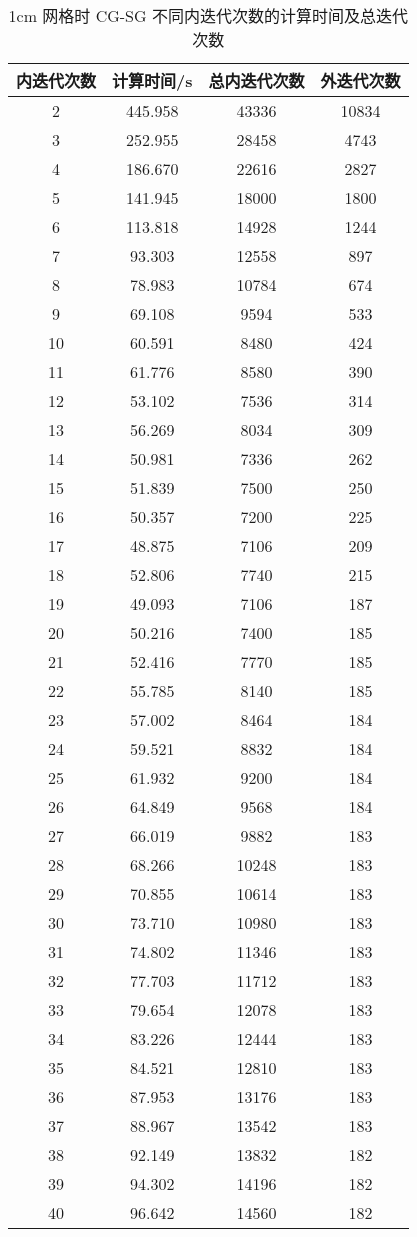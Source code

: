 \begin{datasheet}
\begin{table}
\centering
\caption{1cm 网格时 CG-SG 不同内迭代次数的计算时间及总迭代次数}
\label{tab:equsolve.iter.cg-sg.1cm}
\small
\begin{tabular}{cccc}
\toprule
内迭代次数 & 计算时间/s & 总内迭代次数 & 外迭代次数\\
\midrule
2 & 445.958 & 43336 & 10834\\
3 & 252.955 & 28458 & 4743\\
4 & 186.670 & 22616 & 2827\\
5 & 141.945 & 18000 & 1800\\
6 & 113.818 & 14928 & 1244\\
7 & 93.303 & 12558 & 897\\
8 & 78.983 & 10784 & 674\\
9 & 69.108 & 9594 & 533\\
10 & 60.591 & 8480 & 424\\
11 & 61.776 & 8580 & 390\\
12 & 53.102 & 7536 & 314\\
13 & 56.269 & 8034 & 309\\
14 & 50.981 & 7336 & 262\\
15 & 51.839 & 7500 & 250\\
16 & 50.357 & 7200 & 225\\
17 & 48.875 & 7106 & 209\\
18 & 52.806 & 7740 & 215\\
19 & 49.093 & 7106 & 187\\
20 & 50.216 & 7400 & 185\\
21 & 52.416 & 7770 & 185\\
22 & 55.785 & 8140 & 185\\
23 & 57.002 & 8464 & 184\\
24 & 59.521 & 8832 & 184\\
25 & 61.932 & 9200 & 184\\
26 & 64.849 & 9568 & 184\\
27 & 66.019 & 9882 & 183\\
28 & 68.266 & 10248 & 183\\
29 & 70.855 & 10614 & 183\\
30 & 73.710 & 10980 & 183\\
31 & 74.802 & 11346 & 183\\
32 & 77.703 & 11712 & 183\\
33 & 79.654 & 12078 & 183\\
34 & 83.226 & 12444 & 183\\
35 & 84.521 & 12810 & 183\\
36 & 87.953 & 13176 & 183\\
37 & 88.967 & 13542 & 183\\
38 & 92.149 & 13832 & 182\\
39 & 94.302 & 14196 & 182\\
40 & 96.642 & 14560 & 182\\
\bottomrule
\end{tabular}
\end{table}

\end{datasheet}

